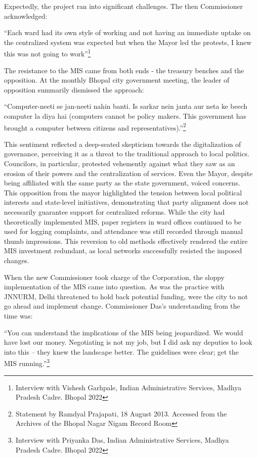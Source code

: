 Expectedly, the project ran into significant challenges. The then Commissioner acknowledged:

``Each ward had its own style of working and not having an immediate uptake on the centralized system was expected but when the Mayor led the protests, I knew this was not going to work''\footnote{Interview with Vishesh Garhpale, Indian Administrative Services, Madhya Pradesh Cadre. Bhopal 2022}

The resistance to the MIS came from both ends - the treasury benches and the opposition. At the monthly Bhopal city government meeting, the leader of opposition summarily dismissed the approach:

``Computer-neeti se jan-neeti nahin banti. Is sarkar nein janta aur neta ke beech computer la diya hai (computers cannot be policy makers. This government has brought a computer between citizens and representatives).''\footnote{Statement by Ramdyal Prajapati, 18 August 2013. Accessed from the Archives of the Bhopal Nagar Nigam Record Room}

This sentiment reflected a deep-seated skepticism towards the digitalization of governance, perceiving it as a threat to the traditional approach to local politics. Councilors, in particular, protested vehemently against what they saw as an erosion of their powers and the centralization of services. Even the Mayor, despite being affiliated with the same party as the state government, voiced concerns. This opposition from the mayor highlighted the tension between local political interests and state-level initiatives, demonstrating that party alignment does not necessarily guarantee support for centralized reforms. While the city had theoretically implemented MIS, paper registers in ward offices continued to be used for logging complaints, and attendance was still recorded through manual thumb impressions. This reversion to old methods effectively rendered the entire MIS investment redundant, as local networks successfully resisted the imposed changes.

When the new Commissioner took charge of the Corporation, the sloppy implementation of the MIS came into question. As was the practice with JNNURM, Delhi threatened to hold back potential funding, were the city to not go ahead and implement change. Commissioner Das's understanding from the time was:

``You can understand the implications of the MIS being jeopardized. We would have lost our money. Negotiating is not my job, but I did ask my deputies to look into this – they knew the landscape better. The guidelines were clear; get the MIS running.''\footnote{Interview with Priyanka Das, Indian Administrative Services, Madhya Pradesh Cadre. Bhopal 2022}

